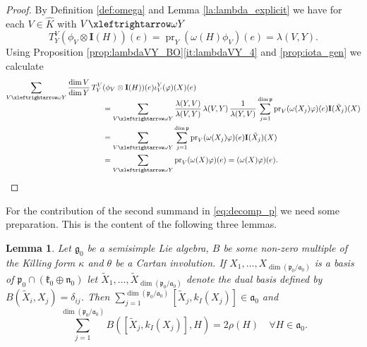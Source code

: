 \documentclass[JEP,XML,SOM,NoFloatCountersInSection,Unicode,published]{cedram}
\newtheorem{lemma}[theorem]{Lemma}
\theoremstyle{definition}
\newcommand{\lraomega}{\ensuremath{\xleftrightarrow\omega}}
\newcommand{\mf}[1]{\ensuremath{\mathfrak{#1}}}
\newcommand{\on}[1]{\ensuremath{\operatorname{#1}}}
\newcommand{\rhoa}{\ensuremath{\rho}}
\newcommand{\I}{\ensuremath{\mathbf{I}}}
\newcommand{\Ik}[1]{\ensuremath{k_I(#1)}}
\begin{document}
\begin{proof}
By Definition \ref{def:omega} and Lemma \ref{la:lambda_explicit} we have for each $V\in\hat K$ with $V\lraomega Y$
\[
T_{Y}^V(\phi_V\otimes\I(H))(e)=\on{pr}_Y(\omega(H)\phi_V)(e)=\lambda(V,Y).
\]
Using Proposition \ref{prop:lambdaVY_BO}\:\ref{it:lambdaVY_4} and \ref{prop:iota_gen} we calculate
\begin{align*}
\sum_{V\lraomega Y}\frac{\dim V}{\dim Y}\,T_{Y}^V&(\phi_V\otimes\I(H))(e)\iota_V^{Y}(\varphi)(X)(e)\\[-10pt]
&=\sum_{V\lraomega Y}\frac{\lambda(Y,V)}{\lambda(V,Y)}\,\lambda(V,Y)\,\frac{1}{\lambda(Y,V)}\sum_{j=1}^{\dim\mf p}\on{pr}_V(\omega(X_j)\varphi)(e)\I(\tilde X_j)(X)\\
&=\sum_{V\lraomega Y}\sum_{j=1}^{\dim\mf p}\on{pr}_V(\omega(X_j)\varphi)(e)\I(\tilde X_j)(X)\\
&=\sum_{V\lraomega Y}\on{pr}_V(\omega(X)\varphi)(e)=(\omega(X)\varphi)(e).\qedhere
\end{align*}
\end{proof}

For the contribution of the second summand in \eqref{eq:decomp_p} we need some preparation. This is the content of the following three lemmas.
\begin{lemma}\label{la:2rho}
Let $\mf g_0$ be a semisimple Lie algebra, $B$ be some non-zero multiple of the Killing form $\kappa$ and $\theta$ be a Cartan involution. If $X_1,\ldots,X_{\dim(\mf p_0/\mf a_0)}$ is a basis of $\mf p_0\cap(\mf k_0\oplus\mf n_0)$ let $\tilde X_1,\ldots,\tilde X_{\dim(\mf p_0/\mf a_0)}$ denote the dual basis defined by $B(\tilde X_i,X_j)=\delta_{ij}$. Then $\sum_{j=1}^{\dim(\mf p_0/\mf a_0)}[\tilde X_j,\Ik{X_j}]\in\mf a_0$ and
\[
\sum_{j=1}^{\dim(\mf p_0/\mf a_0)}B([\tilde X_j,\Ik{X_j}],H)=2\rhoa(H)\quad\forall H\in\mf a_0.
\]
\end{lemma}
\end{document}
